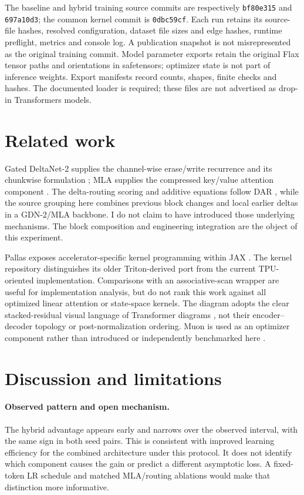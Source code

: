 \documentclass[10pt,a4paper]{article}
\begin{document}
The baseline and hybrid training source commits are respectively
\texttt{bf80e315} and \texttt{697a10d3}; the common kernel commit is \texttt{0dbc59cf}.
Each run retains its source-file hashes, resolved configuration, dataset file sizes and
edge hashes, runtime preflight, metrics and console log. A publication snapshot is not
misrepresented as the original training commit. Model parameter exports retain the
original Flax tensor paths and orientations in safetensors; optimizer state is not part
of inference weights. Export manifests record counts, shapes, finite checks and hashes.
The documented loader is required; these files are not advertised as drop-in Transformers models.

\section{Related work}
Gated DeltaNet-2 supplies the channel-wise erase/write recurrence and its chunkwise
formulation \cite{gdn2}; MLA supplies the compressed key/value attention component
\cite{deepseek}. The delta-routing scoring and additive equations follow DAR \cite{dar},
while the source grouping here combines previous block changes and local earlier deltas
in a GDN-2/MLA backbone. I do not claim to have introduced those underlying mechanisms.
The block composition and engineering integration are the object of this experiment.

Pallas exposes accelerator-specific kernel programming within JAX \cite{pallas}.
The kernel repository distinguishes its older Triton-derived port from the current
TPU-oriented implementation. Comparisons with an associative-scan wrapper are useful
for implementation analysis, but do not rank this work against all optimized linear
attention or state-space kernels. The diagram adopts the clear stacked-residual visual
language of Transformer diagrams \cite{transformer}, not their encoder--decoder topology
or post-normalization ordering. Muon is used as an optimizer component rather than
introduced or independently benchmarked here \cite{muon}.

\section{Discussion and limitations}
\paragraph{Observed pattern and open mechanism.}
The hybrid advantage appears early and narrows over the observed interval, with the same
sign in both seed pairs. This is consistent with improved learning efficiency for the
combined architecture under this protocol. It does not identify which component causes
the gain or predict a different asymptotic loss. A fixed-token LR schedule and matched
MLA/routing ablations would make that distinction more informative.
\end{document}
